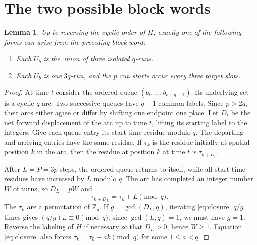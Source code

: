 \documentclass[11pt]{article}
\newtheorem{lemma}[theorem]{Lemma}
\newcommand{\Z}{\mathbb Z}
\begin{document}
\section{The two possible block words}
\begin{lemma}\label{lem:phase}
Up to reversing the cyclic order of $H$, exactly one of the following
forms can arise from the preceding block word:
\begin{enumerate}
\item Each $U_b$ is the union of three isolated $q$-runs.
\item Each $U_b$ is one $3q$-run, and the $p$ run starts occur every
three target slots.
\end{enumerate}
\end{lemma}
\begin{proof}
At time $t$ consider the ordered queue $(b_t,\ldots,b_{t+q-1})$.
Its underlying set is a cyclic $q$-arc.  Two successive queues have
$q-1$ common labels.  Since $p>2q$, their arcs either agree or differ
by shifting one endpoint one place.  Let $D_t$ be the net forward
displacement of the arc up to time $t$, lifting its starting label to
the integers.  Give each queue entry its start-time residue modulo $q$.
The departing and arriving entries have the same residue.  If $\tau_k$
is the residue initially at spatial position $k$ in the arc, then the
residue at position $k$ at time $t$ is $\tau_{k+D_t}$.

After $L=P=3p$ steps, the ordered queue returns to itself, while all
start-time residues have increased by $L$ modulo $q$.  The arc has
completed an integer number $W$ of turns, so $D_L=pW$ and
\begin{equation}\label{eq:closure}
 \tau_{k+D_L}=\tau_k+L\pmod q.
\end{equation}
The $\tau_k$ are a permutation of $\Z_q$.  If $g=\gcd(D_L,q)$,
iterating \eqref{eq:closure} $q/g$ times gives
$(q/g)L\equiv0\pmod q$; since $\gcd(L,q)=1$, we must have $g=1$.
Reverse the labeling of
$H$ if necessary so that $D_L>0$, hence $W\geq1$.
Equation \eqref{eq:closure} also forces
$\tau_k=\tau_0+ak\pmod q$ for some $1\leq a<q$.


\end{proof}
\end{document}
